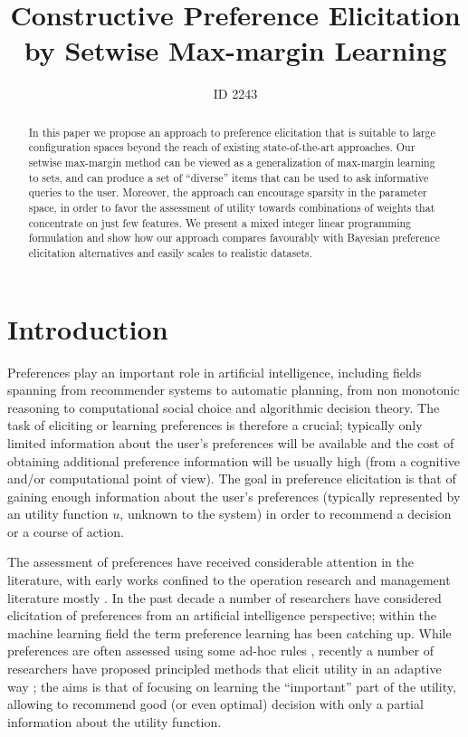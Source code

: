 \documentclass{article}
\title{Constructive Preference Elicitation by Setwise Max-margin Learning} %
\author{ID 2243}
\renewcommand\[{\begin{equation}}
\renewcommand\]{\end{equation}}
\begin{document}
\maketitle

\begin{abstract}
  In this paper we propose an approach to preference elicitation that
  is suitable to large configuration spaces beyond the reach of
  existing state-of-the-art approaches. Our setwise max-margin method
  can be viewed as a generalization of max-margin learning to sets,
  and can produce a set of ``diverse'' items that can be used to ask
  informative queries to the user.  Moreover, the approach can
  encourage sparsity in the parameter space, in order to favor the
  assessment of utility towards combinations of weights that
  concentrate on just few features.  We present a mixed integer linear
  programming formulation and show how our approach compares
  favourably with Bayesian preference elicitation alternatives and
  easily scales to realistic datasets.
\end{abstract}

\section{Introduction}

Preferences \cite{Peintner2008} play an important role in artificial intelligence,
including fields spanning from recommender systems to automatic planning, 
from non monotonic reasoning to computational social choice and algorithmic decision theory.
The task of eliciting or learning preferences is therefore a crucial; typically only limited information about the user's preferences will be available and the cost of obtaining additional preference information will be usually high (from a cognitive and/or computational point of view).
The goal in preference elicitation is that of gaining enough information about the user's preferences (typically represented by an utility function $u$, unknown to the system) in order to recommend a decision or a course of action.

The assessment of preferences have received considerable attention in the literature, with early works confined to the operation research and management literature mostly \cite{}.
In the past decade a number of researchers have considered elicitation of preferences from an artificial intelligence perspective; within the machine learning field the term preference learning has been catching up.
While preferences are often assessed using some ad-hoc rules \cite{},
recently a number of researchers have proposed principled methods that elicit utility in an adaptive way \cite{chajewska2000,boutilier2002,Wang2003,boutilier2006,braziunas2007,guo2010real,viappiani2010optimal}; the aims is that of focusing on learning the ``important'' part of the utility, allowing to recommend good (or even optimal) decision with only a partial information about the utility function.
\end{document}
